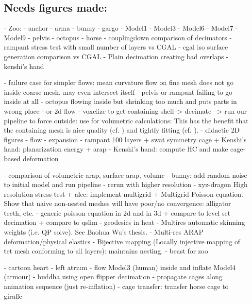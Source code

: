 \subsection{Needs figures made:}
- Zoo:
  - anchor
  - arma
  - bunny
  - gargo
  - Model1
  - Model3
  - Model6
  - Model7
  - Model9
  - pelvis
  - octopus
  - horse
- couplingdown comparison of decimators
- rampant stress test with small number of layers vs CGAL
- cgal iso surface generation comparison vs CGAL
- Plain decimation creating bad overlaps
- kenshi's hand


- failure case for simpler flows: mean curvature flow on fine mesh does not
  go inside coarse mesh, may even intersect itself
    - pelvis or rampant failing to go inside at all
    - octopus flowing inside but shrinking too much and puts parts in wrong
      place
    - or 2d flow
- voxelize to get containing shell--> decimate --> run our pipeline to force
  outside: use for volumetric calculations: This has the benefit that the
  containing mesh is nice quality (cf. \cite{Jacobson:WN:2013}) and tightly
  fitting (cf. \cite{Xu:2014:SDF}).
- didactic 2D figures
  - flow
  - expansion
- rampant 100 layers
+ swat symmetry cage
+ Kenshi's hand: planarization energy + arap
- Kenshi's hand: compute HC and make cage-based deformation

- comparison of volumetric arap, surface arap, volume
- bunny: add random noise to initial model and run pipeline
  - rerun with higher resolution
- xyz-dragon High resolution stress test
+ alec: implement multigrid
  + Multigrid Poisson equation. Show that naive non-nested meshes will have
    poor/no convergence: alligator teeth, etc.
      - generic poisson equation in 2d and in 3d
        + compare to level set decimation
        + compare to qslim
      - geodesics in heat 
  - Multires automatic skinning weights (i.e. QP solve). See Baohua Wu's thesis.
  - Multi-res ARAP deformation/physical elastics
  - Bijective mapping (Locally injective mapping of tet mesh conforming to all
    layers): maintains nesting.
- beast for zoo

- cartoon heart
- left atrium
- flow Model3 (human) inside and inflate Model4 (armour)
- buddha using open flipper decimation
- propagate cages along animation sequence (just re-inflation)
- cage transfer: transfer horse cage to giraffe

